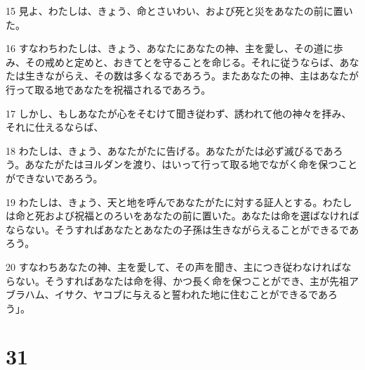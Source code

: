 \par 15 見よ、わたしは、きょう、命とさいわい、および死と災をあなたの前に置いた。
\par 16 すなわちわたしは、きょう、あなたにあなたの神、主を愛し、その道に歩み、その戒めと定めと、おきてとを守ることを命じる。それに従うならば、あなたは生きながらえ、その数は多くなるであろう。またあなたの神、主はあなたが行って取る地であなたを祝福されるであろう。
\par 17 しかし、もしあなたが心をそむけて聞き従わず、誘われて他の神々を拝み、それに仕えるならば、
\par 18 わたしは、きょう、あなたがたに告げる。あなたがたは必ず滅びるであろう。あなたがたはヨルダンを渡り、はいって行って取る地でながく命を保つことができないであろう。
\par 19 わたしは、きょう、天と地を呼んであなたがたに対する証人とする。わたしは命と死および祝福とのろいをあなたの前に置いた。あなたは命を選ばなければならない。そうすればあなたとあなたの子孫は生きながらえることができるであろう。
\par 20 すなわちあなたの神、主を愛して、その声を聞き、主につき従わなければならない。そうすればあなたは命を得、かつ長く命を保つことができ、主が先祖アブラハム、イサク、ヤコブに与えると誓われた地に住むことができるであろう」。

\chapter{31}

